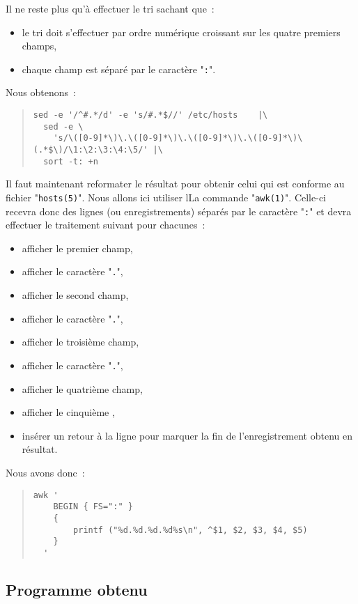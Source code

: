 Il ne reste plus qu'{\`a} effectuer le tri sachant que~:
\begin{itemize}
	\item	le tri doit s'effectuer par ordre num{\'e}rique croissant sur les
			quatre premiers champs,
	\item	chaque champ est s{\'e}par{\'e} par le caract{\`e}re "{\tt :}".
\end{itemize}
Nous obtenons~:
\begin{quote}
\begin{verbatim}
sed -e '/^#.*/d' -e 's/#.*$//' /etc/hosts    |\
  sed -e \
    's/\([0-9]*\)\.\([0-9]*\)\.\([0-9]*\)\.\([0-9]*\)\(.*$\)/\1:\2:\3:\4:\5/' |\
  sort -t: +n
\end{verbatim}
\end{quote}

Il faut maintenant reformater le r{\'e}sultat pour obtenir celui qui est conforme
au fichier "{\tt hosts(5)}". Nous allons ici utiliser lLa commande "{\tt awk(1)}".
Celle-ci recevra donc des lignes (ou enregistrements) s{\'e}par{\'e}s par le caract{\`e}re "{\tt :}"
et devra effectuer le traitement suivant pour chacunes~:
\begin{itemize}
	\item	afficher le premier champ,
	\item	afficher le caract{\`e}re "{\tt .}",
	\item	afficher le second champ,
	\item	afficher le caract{\`e}re "{\tt .}",
	\item	afficher le troisi{\`e}me champ,
	\item	afficher le caract{\`e}re "{\tt .}",
	\item	afficher le quatri{\`e}me champ,
	\item	afficher le cinqui{\`e}me ,
	\item	ins{\'e}rer un retour {\`a} la ligne pour marquer la fin de l'enregistrement obtenu
			en r{\'e}sultat.
\end{itemize}
Nous avons donc~:
\begin{quote}
\begin{verbatim}
awk '
    BEGIN { FS=":" }
    {
        printf ("%d.%d.%d.%d%s\n", ^$1, $2, $3, $4, $5)
    }
  '
\end{verbatim}
\end{quote}

\subsection{Programme obtenu}

